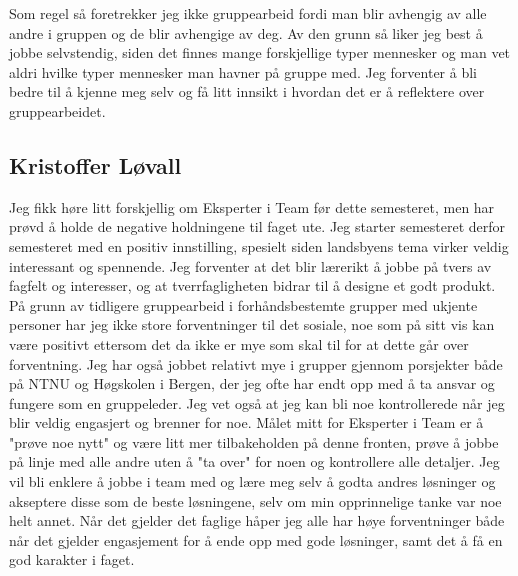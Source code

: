 Som regel så foretrekker jeg ikke gruppearbeid fordi man blir avhengig av alle andre i gruppen og de blir avhengige av deg. 
Av den grunn så liker jeg best å jobbe selvstendig, siden det finnes mange forskjellige typer mennesker og man vet aldri 
hvilke typer mennesker man havner på gruppe med. Jeg forventer å bli bedre til å kjenne meg selv og få litt innsikt i 
hvordan det er å reflektere over gruppearbeidet.

\subsection*{Kristoffer Løvall}
Jeg fikk høre litt forskjellig om Eksperter i Team før dette semesteret, men har 
prøvd å holde de negative holdningene til faget ute. Jeg starter semesteret 
derfor semesteret med en positiv innstilling, spesielt siden landsbyens tema 
virker veldig interessant og spennende. Jeg forventer at det blir lærerikt å 
jobbe på tvers av fagfelt og interesser, og at tverrfagligheten bidrar til å 
designe et godt produkt. På grunn av tidligere gruppearbeid i forhåndsbestemte 
grupper med ukjente personer har jeg ikke store forventninger til det sosiale, 
noe som på sitt vis kan være positivt ettersom det da ikke er mye som skal til 
for at dette går over forventning. Jeg har også jobbet relativt mye i grupper 
gjennom porsjekter både på NTNU og Høgskolen i Bergen, der jeg ofte har endt opp 
med å ta ansvar og fungere som en gruppeleder. Jeg vet også at jeg kan bli noe 
kontrollerede når jeg blir veldig engasjert og brenner for noe.  Målet mitt for 
Eksperter i Team er å "prøve noe nytt" og være litt mer tilbakeholden på denne 
fronten, prøve å jobbe på linje med alle andre uten å "ta over" for noen og 
kontrollere alle detaljer. Jeg vil bli enklere å jobbe i team med og lære meg 
selv å godta andres løsninger og akseptere disse som de beste løsningene, selv om 
min opprinnelige tanke var noe helt annet. Når det gjelder det faglige håper jeg 
alle har høye forventninger både når det gjelder engasjement for å ende opp med 
gode løsninger, samt det å få en god karakter i faget.

